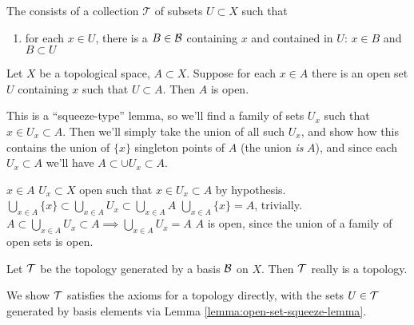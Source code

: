 \begin{defn}\label{defn:generated-topology}
  The  consists of a
  collection $\mathcal{T}$ of subsets $U\subset X$ such that
  \begin{enumerate}
  \item for each $x\in U$, there is a $B\in\mathcal{B}$
    containing $x$ and contained in $U$: $x\in B$ and $B\subset U$
  \end{enumerate}
\end{defn}
\begin{lemma}\label{lemma:open-set-squeeze-lemma}
Let $X$ be a topological space, $A\subset X$. Suppose for each $x\in A$
there is an open set $U$ containing $x$ such that $U\subset A$. Then $A$
is open.
\end{lemma}
\begin{pfSketch}
  This is a ``squeeze-type'' lemma, so we'll find a family of sets
  $U_{x}$ such that $x\in U_{x}\subset A$. Then we'll simply take the
  union of all such $U_{x}$, and show how this contains the union of
  $\{x\}$ singleton points of $A$ (the union \emph{is} $A$), and since
  each $U_{x}\subset A$ we'll have $A\subset\cup U_{x}\subset A$.
\end{pfSketch}
\begin{spf}
  \Let $x\in A$
  \Consider $U_{x}\subset X$ open such that $x\in U_{x}\subset A$ by hypothesis.
  \Then $\bigcup_{x\in A}\{x\}\subset\bigcup_{x\in A}U_{x}\subset\bigcup_{x\in A}A$
  \step $\bigcup_{x\in A}\{x\}=A$, trivially.
  \Hence $A\subset\bigcup_{x\in A}U_{x}\subset A\implies \bigcup_{x\in A}U_{x}=A$
  \Thus $A$ is open, since the union of a family of open sets is open.
\end{spf}
\bigskip%
\smallskip
\begin{thm}
  Let $\mathcal{T}$ be the topology generated by a basis $\mathcal{B}$
  on $X$.
  Then $\mathcal{T}$ really is a topology.
\end{thm}
\begin{pfSketch}
We show $\mathcal{T}$ satisfies the axioms for a topology directly,
with the sets $U\in\mathcal{T}$ generated by basis elements via Lemma
\ref{lemma:open-set-squeeze-lemma}. 
\end{pfSketch}
